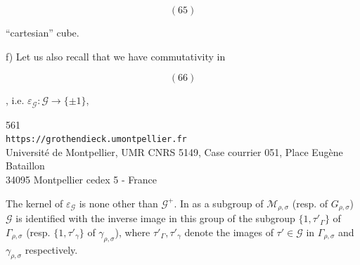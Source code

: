 \begin{samepage}
\[
(65)
\]
\end{samepage}
``cartesian'' cube.

f) Let us also recall that we have commutativity in
\begin{samepage}
\[
(66)
\]
\end{samepage}
, i.e. \(\varepsilon_{\mathcal G}:\mathcal G\longrightarrow\{\pm1\}\),


{\small
\begin{center}
561\\
\texttt{https://grothendieck.umontpellier.fr}\\
Université de Montpellier, UMR CNRS 5149, Case courrier 051, Place Eugène Bataillon\\
34095 Montpellier cedex 5 - France
\end{center}
}


The kernel of $\varepsilon_{\mathcal{G}}$ is none other than $\mathcal{G}^{+}$. In  as a subgroup of $\mathcal M_{\rho,\sigma}$ (resp. of $G_{\rho,\sigma}$) $\mathcal{G}$ is identified with the inverse image in this group of the subgroup $\{1,\tau'_{\Gamma}\}$ of $\Gamma_{\rho,\sigma}$ (resp.  $\{1,\tau'_{\gamma}\}$ of $\gamma_{\rho,\sigma}$), where $\tau'_{\Gamma},\tau'_{\gamma}$ denote the images of $\tau'\in\mathcal{G}$ in $\Gamma_{\rho,\sigma}$ and $\gamma_{\rho,\sigma}$ respectively.

